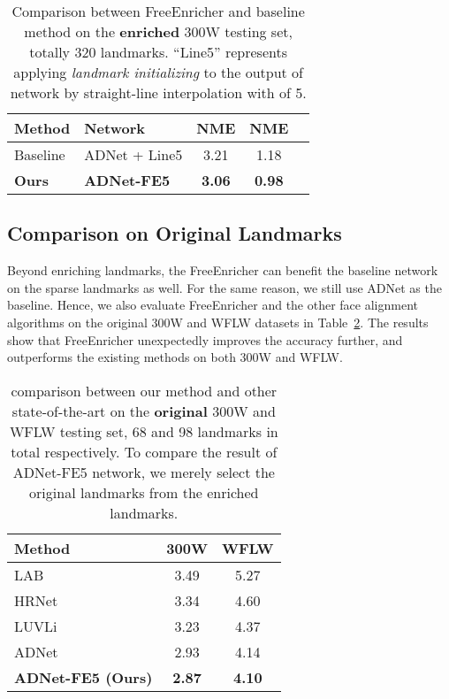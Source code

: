 \documentclass[letterpaper]{article} \usepackage{aaai23}  \usepackage{times}  \usepackage{helvet}  \usepackage{courier}  \usepackage[hyphens]{url}  \usepackage{graphicx} \urlstyle{rm} \def\UrlFont{\rm}  \usepackage{natbib}  \usepackage{caption} \frenchspacing  \setlength{\pdfpagewidth}{8.5in}  \setlength{\pdfpageheight}{11in}  \usepackage{algorithm}
\begin{document}
\begin{table}[htbp]
\begin{center}
 \begin{tabular}{llccc}
\hline
Method & Network & NME & NME \\
\hline
Baseline & ADNet + Line5 & 3.21 & 1.18 \\
\hline
\textbf{Ours} & \textbf{ADNet-FE5} & \textbf{3.06} & \textbf{0.98} \\
\hline
\end{tabular}
\end{center}
\caption{Comparison between FreeEnricher and baseline method on the \textbf{enriched} 300W testing set, totally 320 landmarks. “Line5” represents applying \emph{landmark initializing} to the output of network by straight-line interpolation with  of 5.}
\label{table:300W_enrich}
\end{table}

\subsection{Comparison on Original Landmarks}
Beyond enriching landmarks, the FreeEnricher can benefit the baseline network on the sparse landmarks as well.
For the same reason, we still use ADNet as the baseline.
Hence, we also evaluate FreeEnricher and the other face alignment algorithms on the original 300W and WFLW datasets in Table~\ref{table:300W_WFLW_origin}.
The results show that FreeEnricher unexpectedly improves the accuracy further, and outperforms the existing methods on both 300W and WFLW.

\begin{table}[htbp]
\begin{center}
\begin{tabular}{lcc}
\hline
Method & 300W & WFLW \\
\hline
LAB \cite{wu2018look} & 3.49 & 5.27 \\
HRNet \cite{wang2020deep} & 3.34 & 4.60 \\
LUVLi \cite{kumar2020luvli} & 3.23 & 4.37 \\
ADNet \cite{huang2021adnet} & 2.93 & 4.14 \\
\hline
\textbf{ADNet-FE5 (Ours)} & \textbf{2.87} & \textbf{4.10} \\
\hline
\end{tabular}
\end{center}
\caption{ comparison between our method and other state-of-the-art on the \textbf{original} 300W and WFLW testing set, 68 and 98 landmarks in total respectively. To compare the result of ADNet-FE5 network, we merely select the original landmarks from the enriched landmarks.}
\label{table:300W_WFLW_origin}
\end{table}
\end{document}

